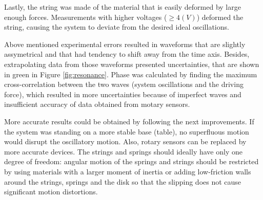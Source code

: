 Lastly, the string was made of the material that is easily deformed by large enough forces. Measurements with higher voltages ($\ge 4 (V)$) deformed the string, causing the system to deviate from the desired ideal oscillations.

Above mentioned experimental errors resulted in waveforms that are slightly assymetrical and that had tendency to shift away from the time axis. Besides, extrapolating data from those waveforms presented uncertainties, that are shown in green in Figure \ref{fig:resonance}. Phase was calculated by finding the maximum cross-correlation between the two waves (system oscillations and the driving force), which resulted in more uncertainties because of imperfect waves and insufficient accuracy of data obtained from motary sensors.

More accurate results could be obtained by following the next improvements. If the system was standing on a more stable base (table), no superfluous motion would disrupt the oscillatory motion. Also, rotary sensors can be replaced by more accurate devices. The strings and springs should ideally have only one degree of freedom: angular motion of the springs and strings should be restricted by using materials with a larger moment of inertia or adding low-friction walls around the strings, springs and the disk so that the slipping does not cause significant motion distortions.
